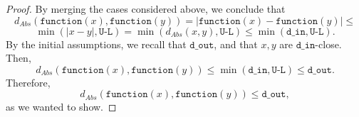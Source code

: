 \documentclass[11pt,a4paper]{article}
\theoremstyle{definition}
\newcommand{\din}{\texttt{d\_in}}
\newcommand{\dout}{\texttt{d\_out}}
\newcommand{\function}{\texttt{function}}
\begin{document}
\begin{proof}
By merging the cases considered above, we conclude that
\[
    d_{Abs}(\function(x), \function(y)) = |\function(x) - \function(y)| \leq 
\]
\[
    \min(|x-y|, \texttt{U-L}) = \min(d_{Abs}(x, y), \texttt{U-L}) \leq \min(\din, \texttt{U-L}).
\]
By the initial assumptions, we recall that $\dout $, and that $x, y$ are $\din$-close. Then,
\[
    d_{Abs}(\function(x), \function(y)) \leq \min(\din, \texttt{U-L}) \leq \dout.
\]
Therefore,
\[
    d_{Abs}(\function(x), \function(y)) \leq \dout,
\]
as we wanted to show.
\end{proof}
\end{document}
